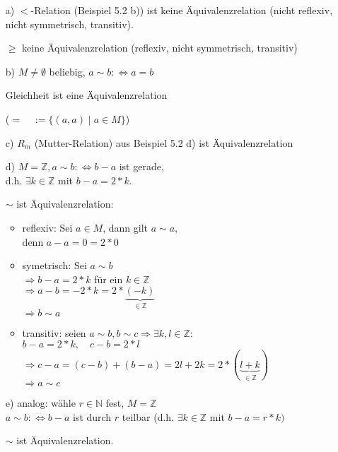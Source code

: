 \documentclass[a4paper, 12pt, twoside] {article}
\begin{document}
\begin{itemize}
\item[a)] $<$-Relation (Beispiel 5.2 b)) ist keine Äquivalenzrelation (nicht reflexiv, nicht symmetrisch, transitiv).

$\geq$ keine Äquivalenzrelation (reflexiv, nicht symmetrisch, transitiv)

\item[b)] $M \neq \emptyset$ beliebig, $a \sim b :\Leftrightarrow a = b$

Gleichheit ist eine Äquivalenzrelation

($= \quad := \{(a,a) \mid a \in M\}$)

\item[c)] $R_m$ (Mutter-Relation) aus Beispiel 5.2 d) ist Äquivalenzrelation


\item[d)] $M = \mathbb{Z}, a \sim b: \Leftrightarrow b - a$ ist gerade, \\
d.h. $\exists k \in \mathbb{Z}$ mit $b-a = 2*k$.

$\sim$ ist Äquivalenzrelation:
\begin{itemize}
\item reflexiv: Sei $a \in M$, dann gilt $a \sim a$, \\
denn $a-a = 0 = 2*0$

\item symetrisch: Sei $a \sim b$ \\
$\Rightarrow b-a = 2*k$ für ein $k \in \mathbb{Z}$ \\
$\Rightarrow a-b = -2*k = 2* \underbrace{(-k)}_{\in \mathbb{Z}}$ \\
$\Rightarrow b \sim a$

\item transitiv: seien $a \sim b, b \sim c \Rightarrow \exists k, l \in \mathbb{Z}$: \\
$b-a = 2*k, \quad c-b = 2*l$ \\
$\Rightarrow c-a = (c-b) + (b-a) = 2l + 2k = 2*(\underbrace{l+k}_{\in \mathbb{Z}})$ \\
$\Rightarrow a \sim c$

\end{itemize}

\item[e)] analog: wähle $r \in \mathbb{N}$ fest, $M = \mathbb{Z}$ \\
$a \sim b: \Leftrightarrow b - a$ ist durch $r$ teilbar (d.h. $\exists k \in \mathbb{Z}$ mit $b-a = r*k)$

$\sim$ ist Äquivalenzrelation.

\end{itemize}
\end{document}
